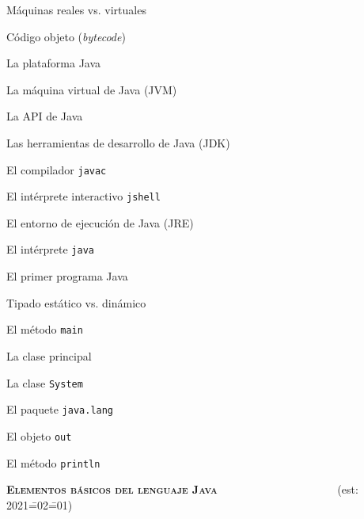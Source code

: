 \begin{longenum}
\begin{longenum}
        \begin{longenum}
            \item Máquinas reales vs. virtuales
            \item Código objeto (\textit{bytecode})
            \item La plataforma Java
            \begin{longenum}
                \item La máquina virtual de Java (JVM)
                \item La API de Java
            \end{longenum}
            \item Las herramientas de desarrollo de Java (JDK)
            \begin{longenum}
                \item El compilador \texttt{javac}
                \item El intérprete interactivo \texttt{jshell}
            \end{longenum}
            \item El entorno de ejecución de Java (JRE)
            \begin{longenum}
                \item El intérprete \texttt{java}
            \end{longenum}
        \end{longenum}
        \item El primer programa Java
        \begin{longenum}
            \item Tipado estático vs. dinámico
            \item El método \texttt{main}
            \item La clase principal
            \item La clase \texttt{System}
            \item El paquete \texttt{java.lang}
            \item El objeto \texttt{out}
            \item El método \texttt{println}
        \end{longenum}
    \end{longenum}
    \item \textbf{\textsc{Elementos básicos del lenguaje Java}} \ \ \ \ \ \ \ \ \ \ \ \ \ \ \ \ \ \ \ \ \ (est: 2021\==02\==01)
    \begin{longenum}

\end{longenum}
\end{longenum}
